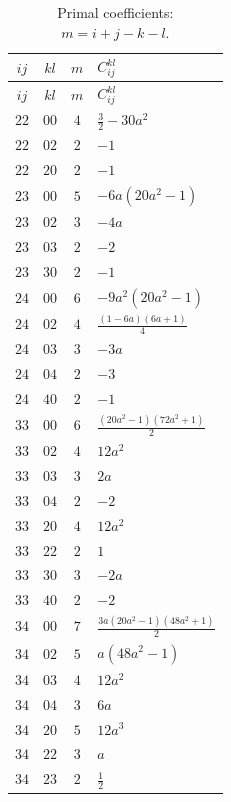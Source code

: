 \begin{longtable}{@{}ccc>{\raggedright\arraybackslash}p{}@{}}
\caption{Primal coefficients: $m=i+j-k-l$.}\label{w4d:tab:C}\\
\toprule $ij$ & $kl$ & $m$ & $C_{ij}^{kl}$ \\ \midrule\endfirsthead
\toprule $ij$ & $kl$ & $m$ & $C_{ij}^{kl}$ \\ \midrule\endhead
\bottomrule\endfoot
$22$ & $00$ & $4$ & $\frac{3}{2} - 30 a^{2}$ \\
$22$ & $02$ & $2$ & $-1$ \\
$22$ & $20$ & $2$ & $-1$ \\
$23$ & $00$ & $5$ & $- 6 a \left(20 a^{2} - 1\right)$ \\
$23$ & $02$ & $3$ & $- 4 a$ \\
$23$ & $03$ & $2$ & $-2$ \\
$23$ & $30$ & $2$ & $-1$ \\
$24$ & $00$ & $6$ & $- 9 a^{2} \left(20 a^{2} - 1\right)$ \\
$24$ & $02$ & $4$ & $\frac{\left(1 - 6 a\right) \left(6 a + 1\right)}{4}$ \\
$24$ & $03$ & $3$ & $- 3 a$ \\
$24$ & $04$ & $2$ & $-3$ \\
$24$ & $40$ & $2$ & $-1$ \\
$33$ & $00$ & $6$ & $\frac{\left(20 a^{2} - 1\right) \left(72 a^{2} + 1\right)}{2}$ \\
$33$ & $02$ & $4$ & $12 a^{2}$ \\
$33$ & $03$ & $3$ & $2 a$ \\
$33$ & $04$ & $2$ & $-2$ \\
$33$ & $20$ & $4$ & $12 a^{2}$ \\
$33$ & $22$ & $2$ & $1$ \\
$33$ & $30$ & $3$ & $- 2 a$ \\
$33$ & $40$ & $2$ & $-2$ \\
$34$ & $00$ & $7$ & $\frac{3 a \left(20 a^{2} - 1\right) \left(48 a^{2} + 1\right)}{2}$ \\
$34$ & $02$ & $5$ & $a \left(48 a^{2} - 1\right)$ \\
$34$ & $03$ & $4$ & $12 a^{2}$ \\
$34$ & $04$ & $3$ & $6 a$ \\
$34$ & $20$ & $5$ & $12 a^{3}$ \\
$34$ & $22$ & $3$ & $a$ \\
$34$ & $23$ & $2$ & $\frac{1}{2}$ \\

\end{longtable}
